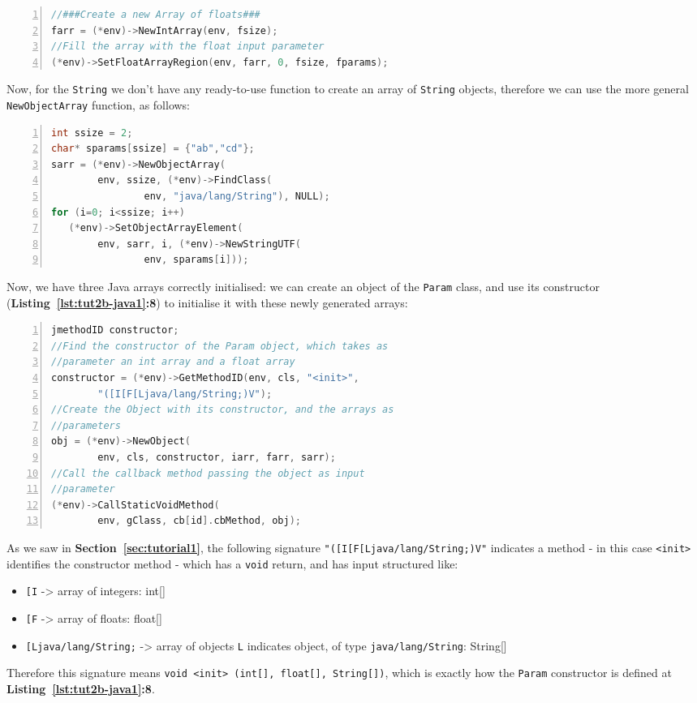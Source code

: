 \documentclass[a4paper,10pt]{article}
\newcommand{\keyword}[1]{\texttt{#1}}
\newcommand{\refl}[1]{\textbf{Listing~\ref{#1}}}
\newcommand{\refs}[1]{\textbf{Section~\ref{#1}}}
\begin{document}
\begin{multicols}{2}
\begin{lstlisting}[language=C,
				   columns=fullflexible,
				   showstringspaces=false,
				   xleftmargin=15pt,
				   frame = l,
				   numbers=left,
				   commentstyle=\color{gray}\upshape]
//###Create a new Array of floats###
farr = (*env)->NewIntArray(env, fsize);
//Fill the array with the float input parameter
(*env)->SetFloatArrayRegion(env, farr, 0, fsize, fparams);
\end{lstlisting}
Now, for the \keyword{String} we don't have any ready-to-use function to create
an array of \keyword{String} objects, therefore we can use the more general
\keyword{NewObjectArray} function, as follows:
\begin{lstlisting}[language=C,
				   columns=fullflexible,
				   showstringspaces=false,
				   xleftmargin=15pt,
				   frame = l,
				   numbers=left,
				   commentstyle=\color{gray}\upshape]
int ssize = 2;
char* sparams[ssize] = {"ab","cd"};
sarr = (*env)->NewObjectArray(
		env, ssize, (*env)->FindClass(
				env, "java/lang/String"), NULL);
for (i=0; i<ssize; i++)
   (*env)->SetObjectArrayElement(
   		env, sarr, i, (*env)->NewStringUTF(
   				env, sparams[i]));
\end{lstlisting}
Now, we have three Java arrays correctly initialised: we can create an object
of the \keyword{Param} class, and use its constructor
(\refl{lst:tut2b-java1}\textbf{:8}) to initialise it with these newly
generated arrays:
\begin{lstlisting}[language=C,
				   columns=fullflexible,
				   showstringspaces=false,
				   xleftmargin=15pt,
				   frame = l,
				   numbers=left,
				   commentstyle=\color{gray}\upshape]
jmethodID constructor;
//Find the constructor of the Param object, which takes as
//parameter an int array and a float array
constructor = (*env)->GetMethodID(env, cls, "<init>",
		"([I[F[Ljava/lang/String;)V");
//Create the Object with its constructor, and the arrays as
//parameters
obj = (*env)->NewObject(
		env, cls, constructor, iarr, farr, sarr);
//Call the callback method passing the object as input
//parameter
(*env)->CallStaticVoidMethod(
		env, gClass, cb[id].cbMethod, obj);
\end{lstlisting}
As we saw in \refs{sec:tutorial1}, the following signature
\keyword{"([I[F[Ljava/lang/String;)V"} indicates a method - in this case
\keyword{<init>} identifies the constructor method - which has a \keyword{void}
return, and has input structured like:
\begin{itemize}
\item \keyword{[I} -> array of integers: int[]
\item \keyword{[F} -> array of floats: float[]
\item \keyword{[Ljava/lang/String;} -> array of objects \keyword{L} indicates
object, of type \keyword{java/lang/String}: String[]
\end{itemize}
Therefore this signature means \keyword{void <init> (int[], float[], String[])},
which is exactly how the \keyword{Param} constructor is defined at
\refl{lst:tut2b-java1}\textbf{:8}.


\end{multicols}
\end{document}
